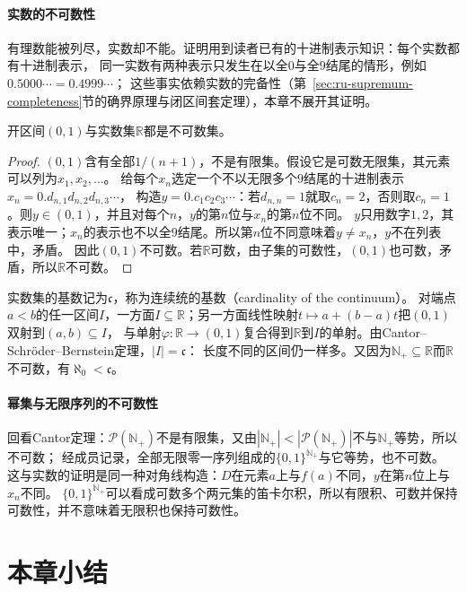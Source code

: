 \paragraph{实数的不可数性}
\label{sec:comb-real-uncountable}
有理数能被列尽，实数却不能。证明用到读者已有的十进制表示知识：每个实数都有十进制表示，
同一实数有两种表示只发生在以全$0$与全$9$结尾的情形，例如$0.5000\cdots=0.4999\cdots$；
这些事实依赖实数的完备性（第~\ref{sec:ru-supremum-completeness}节的确界原理与闭区间套定理），本章不展开其证明。
\begin{theorem}[实数不可数]
\label{thm:card-reals-uncountable}
开区间$(0,1)$与实数集$\mathbb R$都是不可数集。
\end{theorem}
\begin{proof}
$(0,1)$含有全部$1/(n+1)$，不是有限集。假设它是可数无限集，其元素可以列为$x_1,x_2,\ldots$。
给每个$x_n$选定一个不以无限多个$9$结尾的十进制表示$x_n=0.d_{n,1}d_{n,2}d_{n,3}\cdots$，
构造$y=0.c_1c_2c_3\cdots$：若$d_{n,n}=1$就取$c_n=2$，否则取$c_n=1$。则$y\in(0,1)$，并且对每个$n$，$y$的第$n$位与$x_n$的第$n$位不同。
$y$只用数字$1,2$，其表示唯一；$x_n$的表示也不以全$9$结尾。所以第$n$位不同意味着$y\neq x_n$，$y$不在列表中，矛盾。
因此$(0,1)$不可数。若$\mathbb R$可数，由子集的可数性，$(0,1)$也可数，矛盾，所以$\mathbb R$不可数。
\end{proof}

实数集的基数记为$\mathfrak c$，称为连续统的基数（cardinality of the continuum）。
对端点$a<b$的任一区间$I$，一方面$I\subseteq\mathbb R$；另一方面线性映射$t\mapsto a+(b-a)t$把$(0,1)$双射到$(a,b)\subseteq I$，
与单射$\varphi:\mathbb R\to(0,1)$复合得到$\mathbb R$到$I$的单射。由Cantor--Schröder--Bernstein定理，$|I|=\mathfrak c$：
长度不同的区间仍一样多。又因为$\mathbb N_+\subseteq\mathbb R$而$\mathbb R$不可数，有$\aleph_0<\mathfrak c$。

\paragraph{幂集与无限序列的不可数性}
\label{sec:comb-uncountable-power-set}
回看Cantor定理：$\mathcal P(\mathbb N_+)$不是有限集，又由$|\mathbb N_+|<|\mathcal P(\mathbb N_+)|$不与$\mathbb N_+$等势，所以不可数；
经成员记录，全部无限零一序列组成的$\{0,1\}^{\mathbb N_+}$与它等势，也不可数。
这与实数的证明是同一种对角线构造：$D$在元素$a$上与$f(a)$不同，$y$在第$n$位上与$x_n$不同。
$\{0,1\}^{\mathbb N_+}$可以看成可数多个两元集的笛卡尔积，所以有限积、可数并保持可数性，并不意味着无限积也保持可数性。

\section{本章小结}
\label{sec:cardinality-summary}

